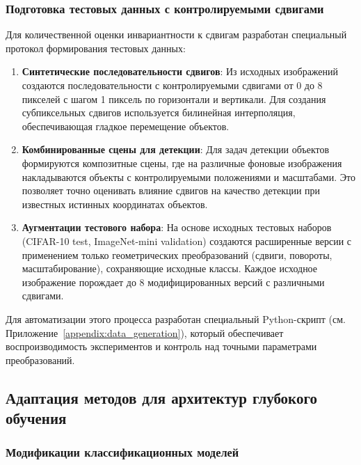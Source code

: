 \subsubsection{Подготовка тестовых данных с контролируемыми сдвигами}
\label{sec:data_preparation}

Для количественной оценки инвариантности к сдвигам разработан специальный протокол формирования тестовых данных:

\begin{enumerate}
    \item \textbf{Синтетические последовательности сдвигов}: 
    Из исходных изображений создаются последовательности с контролируемыми сдвигами от 0 до 8 пикселей с шагом 1 пиксель по горизонтали и вертикали. Для создания субпиксельных сдвигов используется билинейная интерполяция, обеспечивающая гладкое перемещение объектов. 
    
    \item \textbf{Комбинированные сцены для детекции}: 
    Для задач детекции объектов формируются композитные сцены, где на различные фоновые изображения накладываются объекты с контролируемыми положениями и масштабами. Это позволяет точно оценивать влияние сдвигов на качество детекции при известных истинных координатах объектов.
    
    \item \textbf{Аугментации тестового набора}:
    На основе исходных тестовых наборов (CIFAR-10 test, ImageNet-mini validation) создаются расширенные версии с применением только геометрических преобразований (сдвиги, повороты, масштабирование), сохраняющие исходные классы. Каждое исходное изображение порождает до 8 модифицированных версий с различными сдвигами.
\end{enumerate}

Для автоматизации этого процесса разработан специальный Python-скрипт (см. Приложение~\ref{appendix:data_generation}), который обеспечивает воспроизводимость экспериментов и контроль над точными параметрами преобразований.

\subsection{Адаптация методов для архитектур глубокого обучения}
\label{sec:architectures}

\subsubsection{Модификации классификационных моделей}
\label{sec:architectures:classification}

